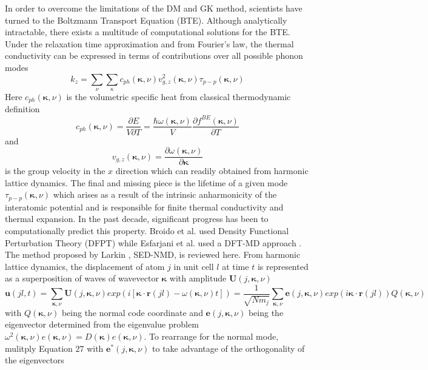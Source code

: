 \documentclass[aps,prb,preprint,preprintnumbers,amsmath,amssymb,floatfix,superscriptaddress]{revtex4}
\begin{document}
In order to overcome the limitations of the DM and GK method, scientists have turned to the Boltzmann Transport Equation (BTE). Although analytically intractable, there exists a multitude of computational solutions for the BTE. Under the relaxation time approximation and from Fourier's law, the thermal conductivity can be expressed in terms of contributions over all possible phonon modes \cite{sellan_CP}
%
\begin{equation}
	k_{z}= \sum_\nu\sum_\kappa c_{ph}(\pmb{\kappa},\nu)v^2_{g,z}(\pmb{\kappa}, \nu)\tau_{p-p}(\pmb{\kappa}, \nu)
\end{equation}
%
Here $c_{ph}(\pmb{\kappa},\nu)$ is the volumetric specific heat from classical thermodynamic definition
%
\begin{equation}
c_{ph}(\pmb{\kappa},\nu)=\frac{\partial E}{V\partial T}=\frac{\hbar\omega(\pmb{\kappa},\nu)}{V}\frac{\partial f^{BE}(\pmb{\kappa}, \nu)}{\partial T}	
\end{equation}
%
and
\begin{equation}
v_{g,z}(\pmb{\kappa}, \nu)=\frac{\partial \omega(\pmb{\kappa},\nu)}{\partial \pmb{\kappa}}
\end{equation}
is the group velocity in the $x$ direction which can readily obtained from harmonic lattice dynamics. The final and missing piece is the lifetime of a given mode $\tau_{p-p}(\pmb{\kappa}, \nu)$ which arises as a result of the intrinsic anharmonicity of the interatomic potential and is responsible for finite thermal conductivity and thermal expansion. In the past decade, significant progress has been to computationally predict this property. Broido et al. used Density Functional Perturbation Theory (DFPT) \cite{Broido1} while Esfarjani et al. used a DFT-MD approach \cite{PhysRevB.84.085204}. The method proposed by Larkin \cite{larkin}, SED-NMD, is reviewed here. From harmonic lattice dynamics, the displacement of atom $j$ in unit cell $l$ at time $t$ is represented as a superposition of waves of wavevector $\pmb{\kappa}$ with amplitude $\pmb{U}(j,\pmb{\kappa},\nu)$
\begin{equation}
\pmb{u}(jl,t)=\sum_{\pmb{\kappa},\nu}\pmb{U}(j,\pmb{\kappa},\nu)exp(i[\pmb{\kappa}\cdot\pmb{r}(jl)-\omega(\pmb{\kappa},\nu)t])=\frac{1}{\sqrt{Nm_j}}\sum_{\pmb{\kappa},\nu}\pmb{e}(j,\pmb{\kappa},\nu)exp(i\pmb{\kappa}\cdot\pmb{r}(jl))Q(\pmb{\kappa},\nu)
\end{equation}
with $Q(\pmb{\kappa},\nu)$ being the normal code coordinate and $\pmb{e}(j,\pmb{\kappa},\nu)$ being the eigenvector determined from the eigenvalue problem $\omega^2(\pmb{\kappa},\nu) e(\pmb{\kappa},\nu)=D(\pmb{\kappa})e(\pmb{\kappa},\nu)$. To rearrange for the normal mode, mulitply Equation 27 with $\pmb{e}^*(j,\pmb{\kappa},\nu)$ to take advantage of the orthogonality of the eigenvectors
\end{document}
